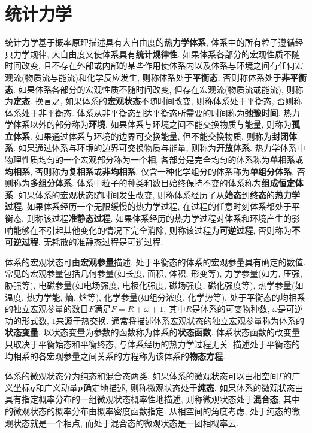 \section[统计力学]{统计力学}\label{统计力学}
统计力学基于概率原理描述具有大自由度的\textbf{热力学体系}, 体系中的所有粒子遵循经典力学规律, 大自由度又使体系具有\textbf{统计规律性}. 如果体系各部分的宏观性质不随时间改变, 且不存在外部或内部的某些作用使体系内以及体系与环境之间有任何宏观流(物质流与能流)和化学反应发生, 则称体系处于\textbf{平衡态}, 否则称体系处于\textbf{非平衡态}. 如果体系各部分的宏观性质不随时间改变, 但存在宏观流(物质流或能流), 则称为\textbf{定态}. 换言之, 如果体系的\textbf{宏观状态}不随时间改变, 则称体系处于平衡态, 否则称体系处于非平衡态. 体系从非平衡态到达平衡态所需要的时间称为\textbf{弛豫时间}. 热力学体系以外的部分称为\textbf{环境}. 如果体系与环境之间不能交换物质与能量, 则称为\textbf{孤立体系}. 如果通过体系与环境的边界可交换能量, 但不能交换物质, 则称为\textbf{封闭体系}. 如果通过体系与环境的边界可交换物质与能量, 则称为\textbf{开放体系}. 热力学体系中物理性质均匀的一个宏观部分称为一个\textbf{相}, 各部分是完全均匀的体系称为\textbf{单相系}或\textbf{均相系}, 否则称为\textbf{复相系}或\textbf{非均相系}. 仅含一种化学组分的体系称为\textbf{单组分体系}, 否则称为\textbf{多组分体系}. 体系中粒子的种类和数目始终保持不变的体系称为\textbf{组成恒定体系}. 如果体系的宏观状态随时间发生改变, 则称体系经历了从\textbf{始态}到\textbf{终态}的\textbf{热力学过程}. 如果体系经历一个无限缓慢的热力学过程, 在过程的任意时刻体系都处于平衡态, 则称该过程\textbf{准静态过程}. 如果体系经历的热力学过程对体系和环境产生的影响能够在不引起其他变化的情况下完全消除, 则称该过程为\textbf{可逆过程}, 否则称为\textbf{不可逆过程}. 无耗散的准静态过程是可逆过程.

体系的宏观状态可由\textbf{宏观参量}描述, 处于平衡态的体系的宏观参量具有确定的数值. 常见的宏观参量包括几何参量(如长度, 面积, 体积, 形变等), 力学参量(如力, 压强, 胁强等), 电磁参量(如电场强度, 电极化强度, 磁场强度, 磁化强度等), 热学参量(如温度, 热力学能, 熵, 焓等), 化学参量(如组分浓度, 化学势等). 处于平衡态的均相系的独立宏观参量的数目$ F $满足$ F=R+\omega+1 $, 其中$ R $是体系的可变物种数, $ \omega $是可逆功的形式数, $ 1 $来源于热交换. 通常将描述体系宏观状态的独立宏观参量称为体系的\textbf{状态变量}, 以状态变量为参数的函数称为体系的\textbf{状态函数}. 体系状态函数的改变量只取决于平衡始态和平衡终态, 与体系经历的热力学过程无关. 描述处于平衡态的均相系的各宏观参量之间关系的方程称为该体系的\textbf{物态方程}.

体系的微观状态分为纯态和混合态两类. 如果体系的微观状态可以由相空间$ \varGamma $的广义坐标$ \vb*{q} $和广义动量$ \vb*{p} $确定地描述, 则称微观状态处于\textbf{纯态}. 如果体系的微观状态由具有指定概率分布的一组微观状态概率性地描述, 则称微观状态处于\textbf{混合态}, 其中的微观状态的概率分布由概率密度函数指定. 从相空间的角度考虑, 处于纯态的微观状态就是一个相点, 而处于混合态的微观状态是一团相概率云.

